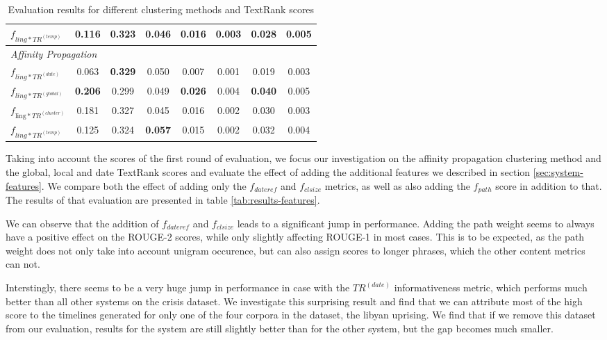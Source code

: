 \documentclass[a4paper,BCOR=10mm]{report}
\numberwithin{lemma}{chapter}
\numberwithin{definition}{chapter}
\begin{document}
\begin{table}
\begin{centering}
{\begin{tabular}{|l|c|cc|cc|cc|}
$f_{ ling*TR^{(temp)} }$     & 0.116    & 0.323 & 0.046 & 0.016 & 0.003 & 0.028 & 0.005 \\\hline
\multicolumn{ 8 }{|l|}{ \textit{ Affinity Propagation } }\\\hline
$f_{ ling*TR^{(date)} }$     & 0.063    & \textbf{ 0.329 }  & 0.050 & 0.007 & 0.001 & 0.019 & 0.003 \\\hline
$f_{ ling*TR^{(global)} }$   & \textbf{ 0.206 } & 0.299 & 0.049 & \textbf{ 0.026 }  & 0.004 & \textbf{ 0.040 }  & 0.005 \\\hline
$f_{ \text{ling}*TR^{(cluster)} }$   & 0.181    & 0.327 & 0.045 & 0.016 & 0.002 & 0.030 & 0.003 \\\hline
$f_{ ling*TR^{(temp)} }$     & 0.125    & 0.324 & \textbf{ 0.057 }  & 0.015 & 0.002 & 0.032 & 0.004 \\\hline
\end{tabular}
}
\end{centering}
\caption{Evaluation results for different clustering methods and TextRank scores}
\label{tab:eval-cl-tr}
\end{table}


Taking into account the scores of the first round of evaluation, we focus our investigation on the affinity propagation clustering method and the global, local and date TextRank scores and evaluate the effect of adding the additional features we described in section \ref{sec:system-features}.
We compare both the effect of adding only the $f_{dateref}$ and $f_{clsize}$ metrics, as well as also adding the $f_{path}$ score in addition to that.
The results of that evaluation are presented in table \ref{tab:results-features}.

We can observe that the addition of $f_{dateref}$ and $f_{clsize}$ leads to a significant jump in performance.
Adding the path weight seems to always have a positive effect on the ROUGE-2 scores, while only slightly affecting ROUGE-1 in most cases.
This is to be expected, as the path weight does not only take into account unigram occurence, but can also assign scores to longer phrases, which the other content metrics can not.

Interstingly, there seems to be a very huge jump in performance in case with the $TR^{(date)}$ informativeness metric, which performs much better than all other systems on the crisis dataset. We investigate this surprising result and find that we can attribute most of the high score to the timelines generated for only one of the four corpora in the dataset, the libyan uprising.
We find that if we remove this dataset from our evaluation, results for the system are still slightly better than for the other system, but the gap becomes much smaller.
\end{document}
